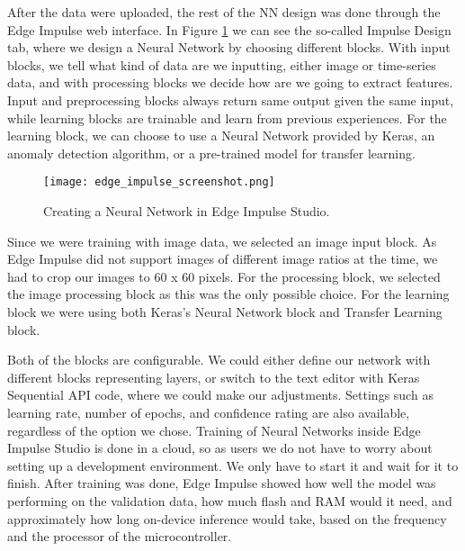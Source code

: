 
After the data were uploaded, the rest of the NN design was done through the Edge Impulse web interface.
In Figure \ref{edge_impulse_screenshot} we can see the so-called Impulse Design tab, where we design a Neural Network by choosing different blocks.
With input blocks, we tell what kind of data are we inputting, either image or time-series data, and with processing blocks we decide how are we going to extract features.
Input and preprocessing blocks always return same output given the same input, while learning blocks are trainable and learn from previous experiences.
For the learning block, we can choose to use a Neural Network provided by Keras, an anomaly detection algorithm, or a pre-trained model for transfer learning.

\begin{figure}[ht]
    \centering
    \texttt{[image: edge\_impulse\_screenshot.png]} 
    \caption{Creating a Neural Network in Edge Impulse Studio.}
    \label{edge_impulse_screenshot}
\end{figure}

Since we were training with image data, we selected an image input block. As Edge Impulse did not support images of different image ratios at the time, we had to crop our images to 60 x 60 pixels.
For the processing block, we selected the image processing block as this was the only possible choice.
For the learning block we were using both Keras's Neural Network block and Transfer Learning block.

Both of the blocks are configurable.
We could either define our network with different blocks representing layers, or switch to the text editor with Keras Sequential API code, where we could make our adjustments.
Settings such as learning rate, number of epochs\footnotemark, and confidence rating are also available, regardless of the option we chose.
Training of Neural Networks inside Edge Impulse Studio is done in a cloud, so as users we do not have to worry about setting up a development environment.
We only have to start it and wait for it to finish.
After training was done, Edge Impulse showed how well the model was performing on the validation data, how much flash and RAM would it need, and approximately how long on-device inference would take, based on the frequency and the processor of the microcontroller.

